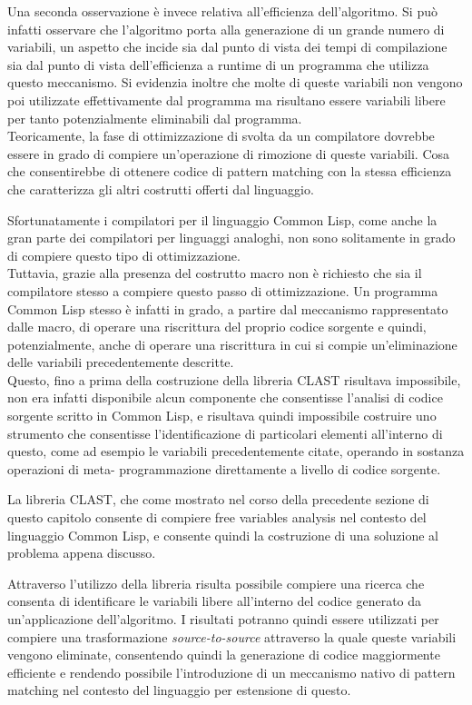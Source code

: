 Una seconda osservazione è invece relativa all'efficienza dell'algoritmo. Si può
infatti osservare che l'algoritmo porta alla generazione di un grande numero di
variabili, un aspetto che incide sia dal punto di vista dei tempi di
compilazione sia dal punto di vista dell'efficienza a runtime di un programma
che utilizza questo meccanismo. Si evidenzia inoltre che molte di queste
variabili non vengono poi utilizzate effettivamente dal programma ma risultano
essere variabili libere per tanto potenzialmente eliminabili dal programma.\\

Teoricamente, la fase di ottimizzazione di svolta da un compilatore dovrebbe
essere in grado di compiere un'operazione di rimozione di queste variabili. Cosa
che consentirebbe di ottenere codice di pattern matching con la stessa
efficienza che caratterizza gli altri costrutti offerti dal linguaggio.

Sfortunatamente i compilatori per il linguaggio Common Lisp, come anche la gran
parte dei compilatori per linguaggi analoghi, non sono solitamente in grado di
compiere questo tipo di ottimizzazione.\\

Tuttavia, grazie alla presenza del costrutto macro non è richiesto che sia il
compilatore stesso a compiere questo passo di ottimizzazione. Un programma
Common Lisp stesso è infatti in grado, a partire dal meccanismo rappresentato
dalle macro, di operare una riscrittura del proprio codice sorgente e quindi,
potenzialmente, anche di operare una riscrittura in cui si compie
un'eliminazione delle variabili precedentemente descritte.\\

Questo, fino a prima della costruzione della libreria CLAST risultava
impossibile, non era infatti disponibile alcun componente che consentisse
l'analisi di codice sorgente scritto in Common Lisp, e risultava quindi
impossibile costruire uno strumento che consentisse l'identificazione di
particolari elementi all'interno di questo, come ad esempio le variabili
precedentemente citate, operando in sostanza operazioni di meta- programmazione
direttamente a livello di codice sorgente.

La libreria CLAST, che come mostrato nel corso della precedente sezione di
questo capitolo consente di compiere free variables analysis nel contesto del
linguaggio Common Lisp, e consente quindi la costruzione di una soluzione al
problema appena discusso.

Attraverso l'utilizzo della libreria risulta possibile compiere una ricerca che
consenta di identificare le variabili libere all'interno del codice generato da
un'applicazione dell'algoritmo. I risultati potranno quindi essere utilizzati
per compiere una trasformazione \textit{source-to-source} attraverso la quale
queste variabili vengono eliminate, consentendo quindi la generazione di codice
maggiormente efficiente e rendendo possibile l'introduzione di un meccanismo
nativo di pattern matching nel contesto del linguaggio per estensione di
questo.\\


